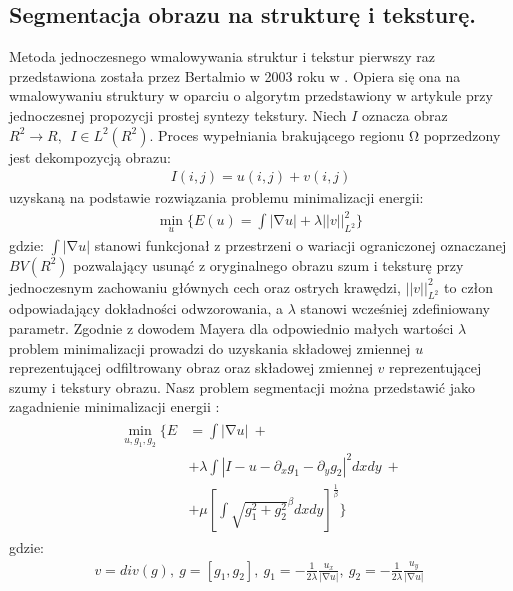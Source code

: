\documentclass[12pt, twoside, openany]{report}
\theoremstyle{definition}
\begin{document}
\subsection{Segmentacja obrazu na strukturę i teksturę.}
Metoda jednoczesnego wmalowywania struktur i tekstur pierwszy raz przedstawiona została przez Bertalmio w 2003 roku w \cite{NavierStokesAndTexturePropagation}. Opiera się ona na wmalowywaniu struktury w oparciu o algorytm przedstawiony w artykule przy jednoczesnej propozycji prostej syntezy tekstury. Niech $I$ oznacza obraz $R^2\to R,\ \ I\in L^2(R^2)$. Proces wypełniania brakującego regionu $\mathrm{\Omega }$ poprzedzony jest dekompozycją obrazu:
\begin{align}
I\left(i,j\right)=u\left(i,j\right)+v\left(i,j\right) 
\label{STRUCTURETEXTURE1}
\end{align}
uzyskaną na podstawie rozwiązania problemu minimalizacji energii:
\begin{align} 
{\mathop{\mathrm{min}}_{u} \Biggl\{E\left(u\right)=\int{\left|\mathrm{\nabla }u\right|+\lambda {\left|\left|v\right|\right|}^2_{L^2}}\Biggr\}\ }
\label{STRUCTURETEXTURE2}
\end{align}
gdzie: $\int{\left|\mathrm{\nabla }u\right|}$ stanowi funkcjonał z przestrzeni o wariacji ograniczonej oznaczanej $BV(R^2)$ pozwalający usunąć z oryginalnego obrazu szum i teksturę przy jednoczesnym zachowaniu głównych cech oraz ostrych krawędzi, ${\left|\left|v\right|\right|}^2_{L^2}$ to człon odpowiadający dokładności odwzorowania, a $\lambda $ stanowi wcześniej zdefiniowany parametr. Zgodnie z dowodem Mayera \cite{meyer2001oscillating} dla odpowiednio małych wartości $\lambda $ problem minimalizacji prowadzi do uzyskania składowej zmiennej $u$ reprezentującej odfiltrowany obraz oraz składowej zmiennej $v$ reprezentującej szumy i tekstury obrazu. Nasz problem segmentacji można przedstawić jako zagadnienie minimalizacji energii \cite{vese2003modeling}:
\begin{align}
\begin{aligned} 
\mathop{\mathrm{min}}_{u,g_1,g_2} \Biggl\{E &= \int{\left|\mathrm{\nabla }u\right| } \ + \\
&+\lambda \int{\left|I-u-\partial_x g_1- \partial_y g_2 \right|}^2dxdy \ +\\
&+ \mu {\left[\int{{\sqrt{g^2_1+g^2_2}}^\beta dxdy}\right]}^{\frac{1}{\beta}}\Biggr\}
\end{aligned}
\end{align}
gdzie:
\begin{align}
v=div(g),\ g=\left[ g_1,g_2 \right],\ g_1=-\frac{1}{2\lambda }\frac{u_x}{\left|\mathrm{\nabla }u\right|},\ g_2=-\frac{1}{2\lambda }\frac{u_y}{\left|\mathrm{\nabla }u\right|}\
\label{VG1G2}
\end{align}
\end{document}

